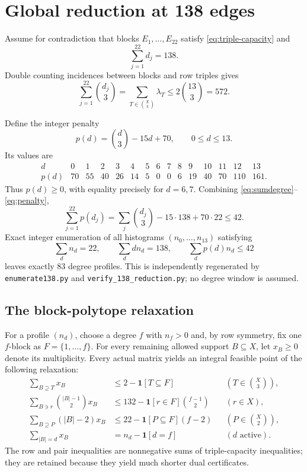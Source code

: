 \documentclass[11pt]{amsart}
\begin{document}
\section{Global reduction at 138 edges}
Assume for contradiction that blocks $E_1,\dots,E_{22}$ satisfy \eqref{eq:triple-capacity} and
\begin{equation}\label{eq:sumdegree}
  \sum_{j=1}^{22}d_j=138.
\end{equation}
Double counting incidences between blocks and row triples gives
\begin{equation}\label{eq:triplecount}
  \sum_{j=1}^{22}\binom{d_j}{3}
  =\sum_{T\in\binom X3}\lambda_T
  \le2\binom{13}{3}=572.
\end{equation}

Define the integer penalty
\begin{equation}\label{eq:penalty}
  p(d)=\binom d3-15d+70,\qquad 0\le d\le13.
\end{equation}
Its values are
\[
\begin{array}{c|rrrrrrrrrrrrrr}
d&0&1&2&3&4&5&6&7&8&9&10&11&12&13\\\hline
p(d)&70&55&40&26&14&5&0&0&6&19&40&70&110&161.
\end{array}
\]
Thus $p(d)\ge0$, with equality precisely for $d=6,7$. Combining \eqref{eq:sumdegree}--\eqref{eq:penalty},
\begin{equation}\label{eq:penaltybudget}
  \sum_{j=1}^{22}p(d_j)
  =\sum_j\binom{d_j}{3}-15\cdot138+70\cdot22
  \le42.
\end{equation}
Exact integer enumeration of all histograms $(n_0,\dots,n_{13})$ satisfying
\[
  \sum_dn_d=22,
  \qquad \sum_ddn_d=138,
  \qquad \sum_dp(d)n_d\le42
\]
leaves exactly $83$ degree profiles. This is independently regenerated by \texttt{enumerate138.py} and \texttt{verify\_138\_reduction.py}; no degree window is assumed.

\subsection{The block-polytope relaxation}
For a profile $(n_d)$, choose a degree $f$ with $n_f>0$ and, by row symmetry, fix one $f$-block as $F=\{1,\dots,f\}$. For every remaining allowed support $B\subseteq X$, let $x_B\ge0$ denote its multiplicity. Every actual matrix yields an integral feasible point of the following relaxation:
\begin{align}
 \sum_{B\supseteq T}x_B
 &\le2-\mathbf1[T\subseteq F]
 &&(T\in\binom X3), \label{eq:lp-triple}\\
 \sum_{B\ni r}\binom{|B|-1}{2}x_B
 &\le132-\mathbf1[r\in F]\binom{f-1}{2}
 &&(r\in X), \label{eq:lp-row}\\
 \sum_{B\supseteq P}(|B|-2)x_B
 &\le22-\mathbf1[P\subseteq F](f-2)
 &&(P\in\binom X2), \label{eq:lp-pair}\\
 \sum_{|B|=d}x_B
 &=n_d-\mathbf1[d=f]
 &&(d\text{ active}). \label{eq:lp-count}
\end{align}
The row and pair inequalities are nonnegative sums of triple-capacity inequalities; they are retained because they yield much shorter dual certificates.
\end{document}
